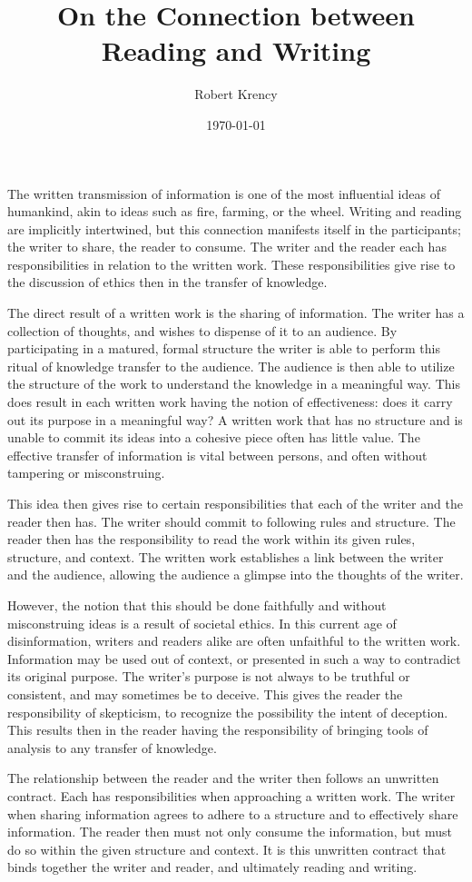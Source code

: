 \documentclass[12pt]{article}
\title{On the Connection between Reading and Writing}
\author{Robert Krency}
\date{\today}
\begin{document}
\maketitle

The written transmission of information is one of the most influential ideas of humankind, akin to ideas such as fire, farming, or the wheel.
Writing and reading are implicitly intertwined, but this connection manifests itself in the participants; the writer to share, the reader to consume.
The writer and the reader each has responsibilities in relation to the written work.
These responsibilities give rise to the discussion of ethics then in the transfer of knowledge.

The direct result of a written work is the sharing of information.
The writer has a collection of thoughts, and wishes to dispense of it to an audience.
By participating in a matured, formal structure the writer is able to perform this ritual of knowledge transfer to the audience.
The audience is then able to utilize the structure of the work to understand the knowledge in a meaningful way.
This does result in each written work having the notion of effectiveness: does it carry out its purpose in a meaningful way?
A written work that has no structure and is unable to commit its ideas into a cohesive piece often has little value.
The effective transfer of information is vital between persons, and often without tampering or misconstruing.

This idea then gives rise to certain responsibilities that each of the writer and the reader then has.
The writer should commit to following rules and structure.
The reader then has the responsibility to read the work within its given rules, structure, and context.
The written work establishes a link between the writer and the audience, allowing the audience a glimpse into the thoughts of the writer.

However, the notion that this should be done faithfully and without misconstruing ideas is a result of societal ethics.
In this current age of disinformation, writers and readers alike are often unfaithful to the written work.
Information may be used out of context, or presented in such a way to contradict its original purpose.
The writer's purpose is not always to be truthful or consistent, and may sometimes be to deceive.
This gives the reader the responsibility of skepticism, to recognize the possibility the intent of deception.
This results then in the reader having the responsibility of bringing tools of analysis to any transfer of knowledge.

The relationship between the reader and the writer then follows an unwritten contract.
Each has responsibilities when approaching a written work.
The writer when sharing information agrees to adhere to a structure and to effectively share information.
The reader then must not only consume the information, but must do so within the given structure and context.
It is this unwritten contract that binds together the writer and reader, and ultimately reading and writing.
\end{document}
